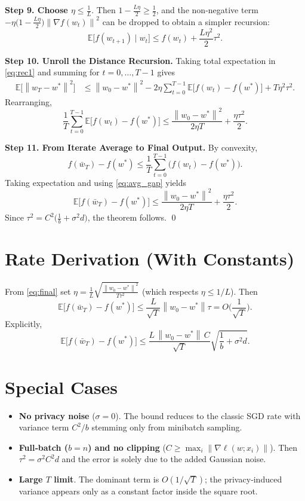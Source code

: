 \documentclass{article}
\newcommand{\E}{\mathbb{E}}
\newcommand{\norm}[1]{\left\lVert #1\right\rVert}
\begin{document}
\bigskip
\noindent\textbf{Step 9. Choose $\eta\le\frac{1}{L}$}.  
Then $1-\frac{L\eta}{2}\ge\frac{1}{2}$, and the non‑negative term $-\eta\big(1-\frac{L\eta}{2}\big)\norm{\nabla f(w_t)}^{2}$ can be dropped to obtain a simpler recursion:
\[
\E\!\big[f(w_{t+1})\mid w_t\big]\le f(w_t)+\frac{L\eta^{2}}{2}\tau^{2}. \tag{11}\label{eq:simple}
\]

\bigskip
\noindent\textbf{Step 10. Unroll the Distance Recursion.}  
Taking total expectation in \eqref{eq:rec1} and summing for $t=0,\dots,T-1$ gives
\begin{align}
\E\!\big[\norm{w_T-w^{*}}^{2}\big]
&\le \norm{w_0-w^{*}}^{2}
-2\eta\sum_{t=0}^{T-1}\E\!\big[f(w_t)-f(w^{*})\big]
+T\eta^{2}\tau^{2}. \tag{12}\label{eq:sum}
\end{align}
Rearranging,
\[
\frac{1}{T}\sum_{t=0}^{T-1}\E\!\big[f(w_t)-f(w^{*})\big]
\le \frac{\norm{w_0-w^{*}}^{2}}{2\eta T}
+\frac{\eta\tau^{2}}{2}. \tag{13}\label{eq:avg_gap}
\]

\bigskip
\noindent\textbf{Step 11. From Iterate Average to Final Output.}  
By convexity,
\[
f(\bar w_T)-f(w^{*})\le\frac{1}{T}\sum_{t=0}^{T-1}\big(f(w_t)-f(w^{*})\big).
\]
Taking expectation and using \eqref{eq:avg_gap} yields
\[
\E\!\big[f(\bar w_T)-f(w^{*})\big]
\le\frac{\norm{w_0-w^{*}}^{2}}{2\eta T}
+\frac{\eta\tau^{2}}{2}. \tag{14}\label{eq:final}
\]
Since $\tau^{2}=C^{2}\big(\frac{1}{b}+\sigma^{2}d\big)$, the theorem follows. \qed

\section*{Rate Derivation (With Constants)}
From \eqref{eq:final} set $\eta=\frac{1}{L}\sqrt{\frac{\norm{w_0-w^{*}}^{2}}{T\tau^{2}}}$ (which respects $\eta\le 1/L$). Then
\[
\E\!\big[f(\bar w_T)-f(w^{*})\big]
\le \frac{L}{\sqrt{T}}\norm{w_0-w^{*}}\tau
= O\!\Big(\frac{1}{\sqrt{T}}\Big).
\]
Explicitly,
\[
\E\!\big[f(\bar w_T)-f(w^{*})\big]
\le
\frac{L\,\norm{w_0-w^{*}}\,C}{\sqrt{T}}\sqrt{\frac{1}{b}+\sigma^{2}d}.
\]

\section*{Special Cases}
\begin{itemize}
\item \textbf{No privacy noise} ($\sigma=0$). The bound reduces to the classic SGD rate with variance term $C^{2}/b$ stemming only from minibatch sampling.
\item \textbf{Full‑batch ($b=n$) and no clipping} ($C\ge\max_i\norm{\nabla\ell(w;x_i)}$). Then $\tau^{2}= \sigma^{2}C^{2}d$ and the error is solely due to the added Gaussian noise.
\item \textbf{Large $T$ limit}. The dominant term is $O(1/\sqrt{T})$; the privacy‑induced variance appears only as a constant factor inside the square root.
\end{itemize}
\end{document}
